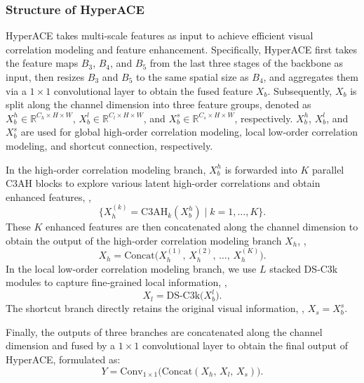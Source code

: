 \subsubsection{Structure of HyperACE}
HyperACE takes multi‐scale features as input to achieve efficient visual correlation modeling and feature enhancement. Specifically, HyperACE first takes the feature maps $B_3$, $B_4$, and $B_5$ from the last three stages of the backbone as input, then resizes $B_3$ and $B_5$ to the same spatial size as \(B_4\), and aggregates them via a \(1\times1\) convolutional layer to obtain the fused feature $X_b$. Subsequently, \(X_b\) is split along the channel dimension into three feature groups, denoted as $X_b^h \in \mathbb{R}^{C_h\times H\times W}$, $X_b^l \in \mathbb{R}^{C_l\times H\times W}$, and $X_b^s \in \mathbb{R}^{C_s\times H\times W}$, respectively. $X_b^h$, $X_b^l$, and $X_b^s$ are used for global high‑order correlation modeling, local low‑order correlation modeling, and shortcut connection, respectively.

In the high‑order correlation modeling branch, $X_b^h$ is forwarded into $K$ parallel C3AH blocks to explore various latent high-order correlations and obtain enhanced features, \ie, 
\begin{equation}
    \bigl\{X_h^{(k)} = \text{C3AH}_k(X_b^h)\mid k=1,\dots,K\bigr\}.
\end{equation}
These \(K\) enhanced features are then concatenated along the channel dimension to obtain the output of the high‑order correlation modeling branch $X_h$, \ie,
\begin{equation}
    X_h = \mathrm{Concat}\bigl(X_h^{(1)},\,X_h^{(2)},\,\dots,\,X_h^{(K)}\bigr).
\end{equation}
In the local low‑order correlation modeling branch, we use $L$ stacked DS‑C3k modules to capture fine‑grained local information, \ie, 
\begin{equation}
    X_l
= \text{DS-C3k}\bigl(X_b^l\bigr).
\end{equation}
The shortcut branch directly retains the original visual information, \ie, $X_s = X_b^s$.

Finally, the outputs of three branches are concatenated along the channel dimension and fused by a \(1\times1\) convolutional layer to obtain the final output of HyperACE, formulated as:
\begin{equation}
    Y = \mathrm{Conv}_{1\times1}\!\bigl(\mathrm{Concat}(X_h,\,X_l,\,X_s)\bigr).
\end{equation}

